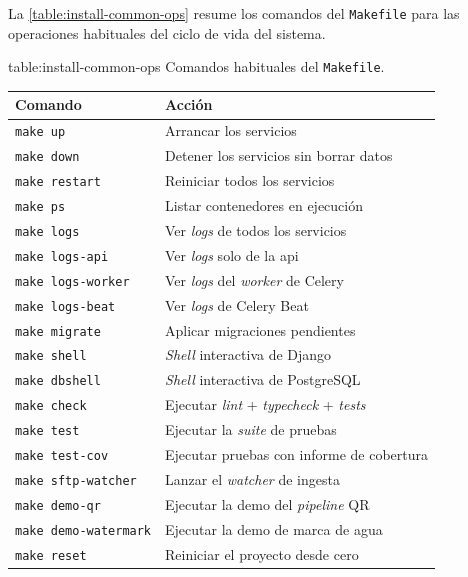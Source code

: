 La \cref{table:install-common-ops} resume los comandos del
\texttt{Makefile} para las operaciones habituales del ciclo de vida del
sistema.

\begin{table}[Comandos habituales del \texttt{Makefile}]%
            {table:install-common-ops}%
            {Comandos habituales del \texttt{Makefile}.}
  \small
  \renewcommand{\arraystretch}{1.3}
  \begin{tabular}{l p{7cm}}
    \hline
    \textbf{Comando} & \textbf{Acción} \\
    \hline
    \texttt{make up}             & Arrancar los servicios \\
    \texttt{make down}           & Detener los servicios sin borrar datos \\
    \texttt{make restart}        & Reiniciar todos los servicios \\
    \texttt{make ps}             & Listar contenedores en ejecución \\
    \texttt{make logs}           & Ver \textit{logs} de todos los servicios \\
    \texttt{make logs-api}       & Ver \textit{logs} solo de la \acs{api} \\
    \texttt{make logs-worker}    & Ver \textit{logs} del \textit{worker} de Celery \\
    \texttt{make logs-beat}      & Ver \textit{logs} de Celery Beat \\
    \texttt{make migrate}        & Aplicar migraciones pendientes \\
    \texttt{make shell}          & \textit{Shell} interactiva de Django \\
    \texttt{make dbshell}        & \textit{Shell} interactiva de PostgreSQL \\
    \texttt{make check}          & Ejecutar \textit{lint} + \textit{typecheck} + \textit{tests} \\
    \texttt{make test}           & Ejecutar la \textit{suite} de pruebas \\
    \texttt{make test-cov}       & Ejecutar pruebas con informe de cobertura \\
    \texttt{make sftp-watcher}   & Lanzar el \textit{watcher} de ingesta \\
    \texttt{make demo-qr}        & Ejecutar la demo del \textit{pipeline} QR \\
    \texttt{make demo-watermark} & Ejecutar la demo de marca de agua \\
    \texttt{make reset}          & Reiniciar el proyecto desde cero \\
    \hline
  \end{tabular}
\end{table}
